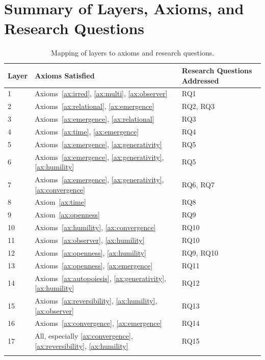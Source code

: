 \section{Summary of Layers, Axioms, and Research Questions}
\label{sec:layer_summary}

\begin{longtable}{l p{4cm} p{5cm}}
\toprule
\textbf{Layer} & \textbf{Axioms Satisfied} & \textbf{Research Questions Addressed} \\
\midrule
1 & Axioms~\ref{ax:irred}, \ref{ax:multi}, \ref{ax:observer} & RQ1 \\
2 & Axioms~\ref{ax:relational}, \ref{ax:emergence} & RQ2, RQ3 \\
3 & Axioms~\ref{ax:emergence}, \ref{ax:relational} & RQ3 \\
4 & Axioms~\ref{ax:time}, \ref{ax:emergence} & RQ4 \\
5 & Axioms~\ref{ax:emergence}, \ref{ax:generativity} & RQ5 \\
6 & Axioms~\ref{ax:emergence}, \ref{ax:generativity}, \ref{ax:humility} & RQ5 \\
7 & Axioms~\ref{ax:emergence}, \ref{ax:generativity}, \ref{ax:convergence} & RQ6, RQ7 \\
8 & Axiom~\ref{ax:time} & RQ8 \\
9 & Axiom~\ref{ax:openness} & RQ9 \\
10 & Axioms~\ref{ax:humility}, \ref{ax:convergence} & RQ10 \\
11 & Axioms~\ref{ax:observer}, \ref{ax:humility} & RQ10 \\
12 & Axioms~\ref{ax:openness}, \ref{ax:humility} & RQ9, RQ10 \\
13 & Axioms~\ref{ax:openness}, \ref{ax:emergence} & RQ11 \\
14 & Axioms~\ref{ax:autopoiesis}, \ref{ax:generativity}, \ref{ax:humility} & RQ12 \\
15 & Axioms~\ref{ax:reversibility}, \ref{ax:humility}, \ref{ax:observer} & RQ13 \\
16 & Axioms~\ref{ax:convergence}, \ref{ax:emergence} & RQ14 \\
17 & All, especially \ref{ax:convergence}, \ref{ax:reversibility}, \ref{ax:humility} & RQ15 \\
\bottomrule
\caption{Mapping of layers to axioms and research questions.}
\label{tab:layer_mapping}
\end{longtable}